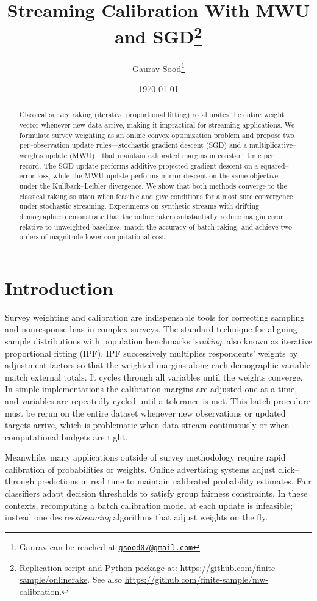 \documentclass[12pt, letterpaper]{article}
\title{Streaming Calibration With MWU and SGD\thanks{Replication script and Python package at: \href{https://github.com/finite-sample/onlinerake}{https://github.com/finite-sample/onlinerake}. See also \href{https://github.com/finite-sample/mw-calibration}{https://github.com/finite-sample/mw-calibration}. }}
\author{Gaurav Sood\thanks{Gaurav can be reached at \href{mailto:gsood07@gmail.com}{\footnotesize{\texttt{gsood07@gmail.com}}}}\vspace{.5cm}}
\date{\today}
\begin{document}
\maketitle

\begin{abstract}
Classical survey raking (iterative proportional fitting) recalibrates the entire
weight vector whenever new data arrive, making it impractical for streaming
applications.  We formulate survey weighting as an online convex optimization
problem and propose two per--observation update rules—stochastic gradient
descent (SGD) and a multiplicative--weights update (MWU)—that maintain
calibrated margins in constant time per record.  The SGD update performs
additive projected gradient descent on a squared–error loss, while the MWU
update performs mirror descent on the same objective under the
Kullback–Leibler divergence.  We show that both methods converge to the
classical raking solution when feasible and give conditions for almost
sure convergence under stochastic streaming.  Experiments on synthetic
streams with drifting demographics demonstrate that the online rakers
substantially reduce margin error relative to unweighted baselines, match
the accuracy of batch raking, and achieve two orders of magnitude lower
computational cost.
\end{abstract}

\section{Introduction}

Survey weighting and calibration are indispensable tools for correcting
sampling and nonresponse bias in complex surveys.  The standard technique
for aligning sample distributions with population benchmarks is\emph{raking},
also known as iterative proportional fitting (IPF)\citep{Deming1940}.  IPF
successively multiplies respondents' weights by adjustment factors so that
the weighted margins along each demographic variable match external totals.
It cycles through all variables until the weights converge.  In simple
implementations the calibration margins are adjusted one at a time, and variables are repeatedly cycled until a tolerance is met.  This batch
procedure must be rerun on the entire dataset whenever new observations or
updated targets arrive, which is problematic when data stream continuously
or when computational budgets are tight.

Meanwhile, many applications outside of survey methodology require rapid
calibration of probabilities or weights.  Online advertising systems adjust
click–through predictions in real time to maintain calibrated probability
estimates\citep{Niculescu2005,Guo2017}.  Fair classifiers adapt decision
thresholds to satisfy group fairness constraints\citep{Agarwal2018}.  In
these contexts, recomputing a batch calibration model at each update is
infeasible; instead one desires\emph{streaming} algorithms that adjust
weights on the fly.
\end{document}

